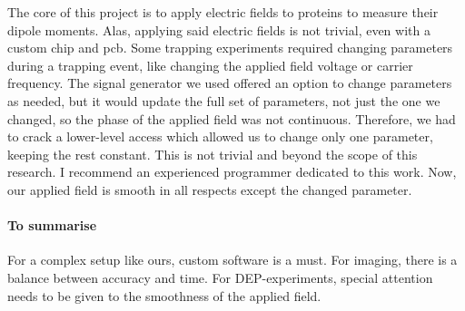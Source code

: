         The core of this project is to apply electric fields to proteins to measure their dipole moments. Alas, applying said electric fields is not trivial, even with a custom chip and \gls{pcb}. Some trapping experiments required changing parameters during a trapping event, like changing the applied field voltage or carrier frequency. The signal generator we used offered an option to change parameters as needed, but it would update the full set of parameters, not just the one we changed, so the phase of the applied field was not continuous. Therefore, we had to crack a lower-level access which allowed us to change only one parameter, keeping the rest constant. This is not trivial and beyond the scope of this research. I recommend an experienced programmer dedicated to this work. Now, our applied field is smooth in all respects except the changed parameter. 

        \paragraph{To summarise}
        For a complex setup like ours, custom software is a must. For imaging, there is a balance between accuracy and time. For \gls{DEP}-experiments, special attention needs to be given to the smoothness of the applied field. 
        
